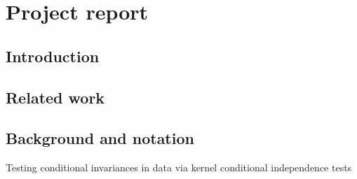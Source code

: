 

\section{Project report}

\subsection{Introduction}

\subsection{Related work}

\subsection{Background and notation}

Testing conditional invariances in data via kernel conditional independence tests

